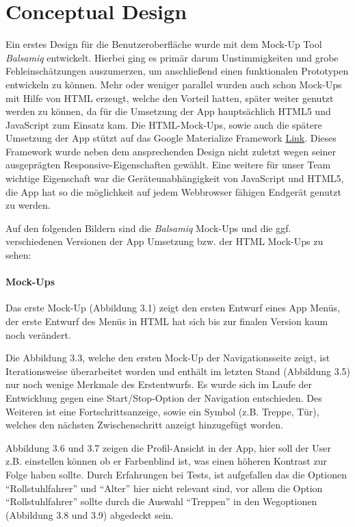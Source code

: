 \chapter{Conceptual Design}
Ein erstes Design für die Benutzeroberfläche wurde mit dem Mock-Up Tool \textit{Balsamiq} entwickelt. Hierbei ging es primär darum Unstimmigkeiten und grobe Fehleinschätzungen auszumerzen, um anschließend einen funktionalen Prototypen entwickeln zu können. Mehr oder weniger parallel wurden auch schon Mock-Ups mit Hilfe von HTML erzeugt, welche den Vorteil hatten, später weiter genutzt werden zu können, da für die Umsetzung der App hauptsächlich HTML5 und JavaScript zum Einsatz kam. Die HTML-Mock-Ups, sowie auch die spätere Umsetzung der App stützt auf das Google Materialize Framework \hyperlink{http://materializecss.com/}{Link}. Dieses Framework wurde neben dem ansprechenden Design nicht zuletzt wegen seiner ausgeprägten Responsive-Eigenschaften gewählt. Eine weitere für unser Team wichtige Eigenschaft war die Geräteunabhängigkeit von JavaScript und HTML5, die App hat so die möglichkeit auf jedem Webbrowser fähigen Endgerät genutzt zu werden.

Auf den folgenden Bildern sind die \textit{Balsamiq} Mock-Ups und die ggf. verschiedenen Versionen der App Umsetzung bzw. der HTML Mock-Ups zu sehen:

\newpage

\subsubsection*{Mock-Ups}

Das erste Mock-Up (Abbildung 3.1) zeigt den ersten Entwurf eines App Menüs, der erste Entwurf des Menüs in HTML hat sich bis zur finalen Version kaum noch verändert.

Die Abbildung 3.3, welche den ersten Mock-Up der Navigationsseite zeigt, ist Iterationsweise überarbeitet worden und enthält im letzten Stand (Abbildung 3.5) nur noch wenige Merkmale des Erstentwurfs. Es wurde sich im Laufe der Entwicklung gegen eine Start/Stop-Option der Navigation entschieden. Des Weiteren ist eine Fortschrittsanzeige, sowie ein Symbol (z.B. Treppe, Tür), welches den nächsten Zwischenschritt anzeigt hinzugefügt worden.

Abbildung 3.6 und 3.7 zeigen die Profil-Ansicht in der App, hier soll der User z.B. einstellen können ob er Farbenblind ist, was einen höheren Kontrast zur Folge haben sollte. Durch Erfahrungen bei Tests, ist aufgefallen das die Optionen "`Rollstuhlfahrer"' und "`Alter"' hier nicht relevant sind, vor allem die Option "`Rollstuhlfahrer"' sollte durch die Auswahl "`Treppen"' in den Wegoptionen (Abbildung 3.8 und 3.9) abgedeckt sein.


